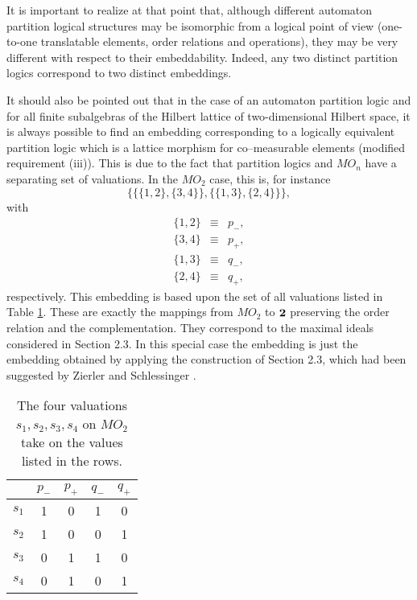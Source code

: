 It is important to realize at that point that, although
different automaton partition logical structures may be isomorphic from a
logical point of
view (one-to-one translatable elements, order relations and operations),
they may
be very different with respect to their embeddability. Indeed, any two
distinct partition logics correspond to two distinct embeddings.

It should also be pointed out that in the case of an automaton partition
logic and for all finite subalgebras of the Hilbert lattice of
two-dimensional Hilbert space, it is always possible to find an
embedding corresponding to a logically equivalent partition
logic which is a lattice
morphism for co--measurable elements (modified requirement (iii)).
This is due to the fact that partition logics and $MO_{n}$ have a
separating set of valuations. In the $MO_2$ case, this is, for instance
$$\{\{\{1,2\},\{3,4\}\},\{\{1,3\},\{2,4\}\}\},$$
with
\begin{eqnarray*}
\{1,2\}&\equiv& p_-,\\
\{3,4\}&\equiv& p_+,\\
\{1,3\}&\equiv& q_-,\\
\{2,4\}&\equiv& q_+,
\end{eqnarray*}
respectively. This embedding is based upon the set of all
valuations listed in Table \ref{t-mo2-tvs}. These are exactly the mappings
from $MO_2$ to ${\bf 2}$ preserving the order relation and the complementation.
They correspond to the maximal ideals considered in Section 2.3. In this
special case the embedding is just the embedding obtained by applying
the construction of Section 2.3, which had been  suggested by
Zierler and Schlessinger \cite[Theorem 2.1]{ZirlSchl-65}.
%
\begin{table}
\begin{center}
\begin{tabular}{|c|cccc|}
\hline\hline
      &$p_{-}$& $p_{+}$& $q_{-}$& $q_{+}$\\
\hline
$s_1$ &1  &  0&     1 &   0  \\
$s_2$ &1  &  0&     0 &   1  \\
$s_3$ &0  &  1&     1 &   0  \\
$s_4$ &0  &  1&     0 &   1  \\
\hline\hline
\end{tabular}
\end{center}
\caption{The four valuations $s_{1},s_{2},s_{3},s_{4}$
on
$MO_2$ take on the values listed in the rows.
\label{t-mo2-tvs}}
\end{table}
